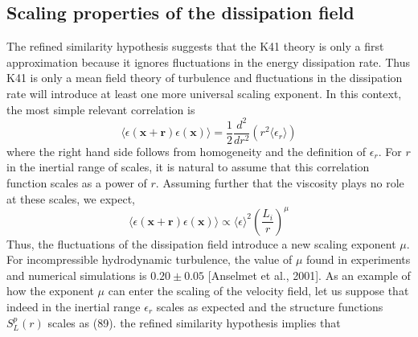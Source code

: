 \subsection{Scaling properties of the dissipation field}
The refined similarity hypothesis suggests that the K41 theory is only a first approximation because it ignores fluctuations in the energy dissipation rate. Thus K41 is only a mean field theory of turbulence and fluctuations in the dissipation rate will introduce at least one more universal scaling exponent. In this context, the most simple relevant correlation is
\begin{equation}
    \langle\epsilon(\mathbf{x}+\mathbf{r})\epsilon(\mathbf{x})\rangle=\frac{1}{2}\frac{d^2}{dr^2}(r^2\langle\epsilon_r\rangle)
\end{equation}
where the right hand side follows from homogeneity and the definition of $\epsilon_r$. For $r$ in the inertial range of scales, it is natural to assume that this correlation function scales as a power of $r$. Assuming further that the viscosity plays no role at these scales, we expect, 
\begin{equation}
    \langle\epsilon(\mathbf{x}+\mathbf{r})\epsilon(\mathbf{x})\rangle\propto\langle\epsilon\rangle^2\left(\frac{L_i}{r}\right)^\mu
\end{equation}
Thus, the fluctuations of the dissipation field introduce a new scaling exponent $\mu$. For incompressible hydrodynamic turbulence, the value of $\mu$ found in experiments and numerical simulations is $0.20 \pm 0.05$ [Anselmet et al., 2001].
As an example of how the exponent $\mu$ can enter the scaling of the velocity field, let us suppose that indeed in the inertial range $\epsilon_r$ scales as expected and the structure functions $S_L^p(r)$ scales as (89). the refined similarity hypothesis implies that 
